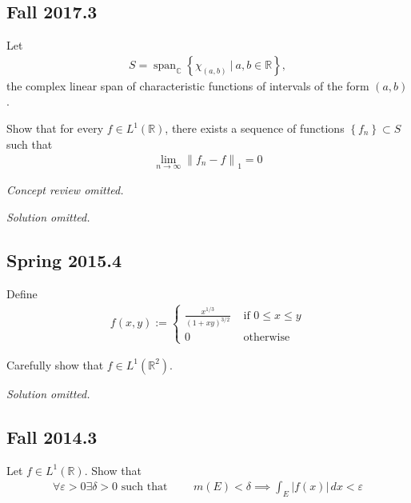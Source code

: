 \hypertarget{fall-2017.3}{%
\subsection{Fall 2017.3}\label{fall-2017.3}}

Let
\begin{align*}
S = \mathop{\mathrm{span}}_{\mathbb{C}}\left\{{\chi_{(a, b)} {~\mathrel{\Big\vert}~}a, b \in {\mathbb{R}}}\right\},
\end{align*}
the complex linear span of characteristic functions of intervals of the
form \((a, b)\).

Show that for every \(f\in L^1({\mathbb{R}})\), there exists a sequence
of functions \(\left\{{f_n}\right\} \subset S\) such that
\begin{align*}
\lim _{n \rightarrow \infty}\left\|f_{n}-f\right\|_{1}=0
\end{align*}

\emph{Concept review omitted.}

\emph{Solution omitted.}

\hypertarget{spring-2015.4}{%
\subsection{Spring 2015.4}\label{spring-2015.4}}

\begin{problem}[?]

Define
\begin{align*}
f(x, y):=\left\{\begin{array}{ll}{\frac{x^{1 / 3}}{(1+x y)^{3 / 2}}} & {\text { if } 0 \leq x \leq y} \\ {0} & {\text { otherwise }}\end{array}\right.
\end{align*}

Carefully show that \(f \in L^1({\mathbb{R}}^2)\).

\end{problem}

\emph{Solution omitted.}

\hypertarget{fall-2014.3}{%
\subsection{Fall 2014.3}\label{fall-2014.3}}

\begin{problem}[?]

Let \(f\in L^1({\mathbb{R}})\). Show that
\begin{align*}
\forall\varepsilon > 0 \exists \delta > 0 \text{ such that } \qquad 
m(E) < \delta 
\implies 
\int _{E} |f(x)| \, dx < \varepsilon
\end{align*}

\end{problem}

